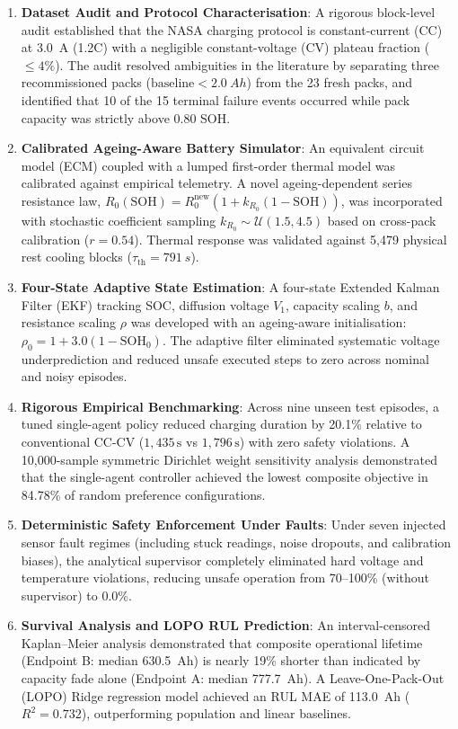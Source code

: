 \begin{enumerate}
  \item \textbf{Dataset Audit and Protocol Characterisation}:
  A rigorous block-level audit established that the NASA charging protocol
  is constant-current (CC) at \SI{3.0}{A} (1.2C) with a negligible
  constant-voltage (CV) plateau fraction ($\le 4\%$). The audit resolved
  ambiguities in the literature by separating three recommissioned packs
  ($\mathrm{baseline} < \SI{2.0}{Ah}$) from the 23 fresh packs, and
  identified that 10 of the 15 terminal failure events occurred while
  pack capacity was strictly above 0.80 SOH.

  \item \textbf{Calibrated Ageing-Aware Battery Simulator}:
  An equivalent circuit model (ECM) coupled with a lumped first-order
  thermal model was calibrated against empirical telemetry. A novel
  ageing-dependent series resistance law,
  $R_0(\mathrm{SOH}) = R_0^{\mathrm{new}}(1 + k_{R_0}(1-\mathrm{SOH}))$,
  was incorporated with stochastic coefficient sampling
  $k_{R_0} \sim \mathcal{U}(1.5, 4.5)$ based on cross-pack calibration
  ($r = 0.54$). Thermal response was validated against 5{,}479 physical
  rest cooling blocks ($\tau_{\mathrm{th}} = \SI{791}{s}$).

  \item \textbf{Four-State Adaptive State Estimation}:
  A four-state Extended Kalman Filter (EKF) tracking SOC, diffusion voltage
  $V_1$, capacity scaling $b$, and resistance scaling $\rho$ was developed
  with an ageing-aware initialisation: $\rho_0 = 1 + 3.0(1 - \mathrm{SOH}_0)$.
  The adaptive filter eliminated systematic voltage underprediction and
  reduced unsafe executed steps to zero across nominal and noisy episodes.

  \item \textbf{Rigorous Empirical Benchmarking}:
  Across nine unseen test episodes, a tuned single-agent policy reduced
  charging duration by 20.1\% relative to conventional CC-CV ($1{,}435\,\mathrm{s}$
  vs $1{,}796\,\mathrm{s}$) with zero safety violations. A 10{,}000-sample
  symmetric Dirichlet weight sensitivity analysis demonstrated that the
  single-agent controller achieved the lowest composite objective in
  84.78\% of random preference configurations.

  \item \textbf{Deterministic Safety Enforcement Under Faults}:
  Under seven injected sensor fault regimes (including stuck readings,
  noise dropouts, and calibration biases), the analytical supervisor
  completely eliminated hard voltage and temperature violations, reducing
  unsafe operation from 70--100\% (without supervisor) to 0.0\%.

  \item \textbf{Survival Analysis and LOPO RUL Prediction}:
  An interval-censored Kaplan--Meier analysis demonstrated that composite
  operational lifetime (Endpoint B: median \SI{630.5}{Ah}) is nearly
  19\% shorter than indicated by capacity fade alone (Endpoint A: median
  \SI{777.7}{Ah}). A Leave-One-Pack-Out (LOPO) Ridge regression model
  achieved an RUL MAE of \SI{113.0}{Ah} ($R^2 = 0.732$), outperforming
  population and linear baselines.
\end{enumerate}
